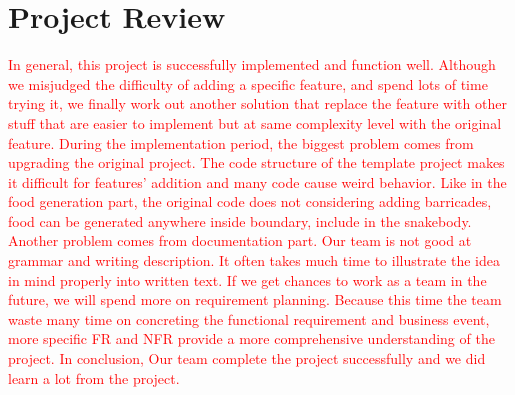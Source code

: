 \documentclass{article}
\begin{document}
\section{Project Review}
\textcolor{red}{In general, this project is successfully implemented and function well. Although we misjudged the difficulty of adding a specific feature, and spend lots of time trying it, we finally work out another solution that replace the feature with other stuff that are easier to implement but at same complexity level with the original feature. During the implementation period, the biggest problem comes from upgrading the original project. The code structure of the template project makes it difficult for features' addition and many code cause weird behavior. Like in the food generation part, the original code does not considering adding barricades, food can be generated anywhere inside boundary, include in the snakebody. Another problem comes from documentation part. Our team is not good at grammar and writing description. It often takes much time to illustrate the idea in mind properly into written text. If we get chances to work as a team in the future, we will spend more on requirement planning. Because this time the team waste many time on concreting the functional requirement and business event, more specific FR and NFR provide a more comprehensive understanding of the project. In conclusion, Our team complete the project successfully and we did learn a lot from the project.}\\
\end{document}
